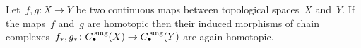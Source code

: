 \begin{remark}
%   
\end{remark}


\begin{example}
  Let~$f, g \colon X \to Y$ be two continuous maps between topological spaces~$X$ and~$Y$.
  If the maps~$f$ and~$g$ are homotopic then their induced morphisms of chain complexes~$f_*, g_* \colon C_\bullet^{\,\mathrm{sing}}(X) \to C_\bullet^{\,\mathrm{sing}}(Y)$ are again homotopic.
\end{example}


